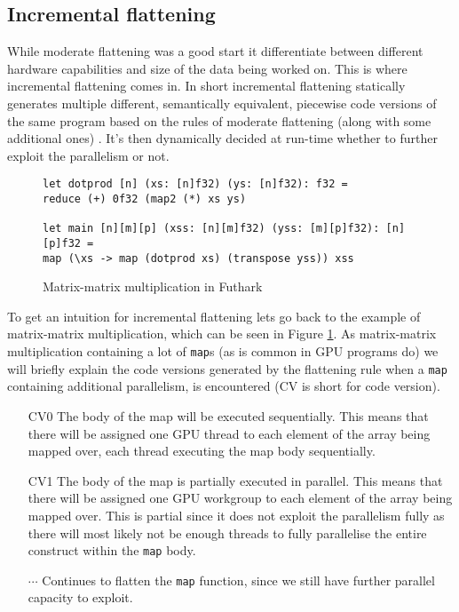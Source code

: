 \subsection{Incremental flattening}
While moderate flattening was a good start it differentiate between different
hardware capabilities and size of the data being worked on. This is where 
incremental flattening comes in. In short incremental flattening statically 
generates multiple different, semantically equivalent, piecewise code versions 
of the same program based on the rules of moderate flattening (along with some 
additional ones) \cite{inc-flat}. It's then dynamically decided at run-time 
whether to further exploit the parallelism or not.
\begin{figure}[h]
\centering
\lstset{language=haskell}
\begin{lstlisting}
let dotprod [n] (xs: [n]f32) (ys: [n]f32): f32 =
reduce (+) 0f32 (map2 (*) xs ys)

let main [n][m][p] (xss: [n][m]f32) (yss: [m][p]f32): [n][p]f32 =
map (\xs -> map (dotprod xs) (transpose yss)) xss
\end{lstlisting}%
\caption{Matrix-matrix multiplication in Futhark \cite{ppopp}}
\label{matmultFuthark}
\end{figure}
To get an intuition for incremental flattening lets go back to the example of
matrix-matrix multiplication, which can be seen in Figure \ref{matmultFuthark}.
As matrix-matrix multiplication containing a lot of \texttt{map}s (as is common 
in GPU programs do) we will briefly explain the code versions generated by the 
flattening rule when a \texttt{map} containing additional parallelism, is 
encountered (CV is short for code version).
\begin{itemize}
\item[CV0] The body of the map will be executed sequentially. This means that 
there will be assigned one GPU thread to each element of the array being mapped 
over, each thread executing the map body sequentially.
\item[CV1] The body of the map is partially executed in parallel. This means 
that there will be assigned one GPU workgroup to each element of the 
array being mapped over. This is partial since it does not exploit the 
parallelism fully as there will most likely not be enough threads to fully 
parallelise the entire construct within the \texttt{map} body.
\item[$\cdots$] Continues to flatten the \texttt{map} function, since we still 
have further parallel capacity to exploit.  \end{itemize}
